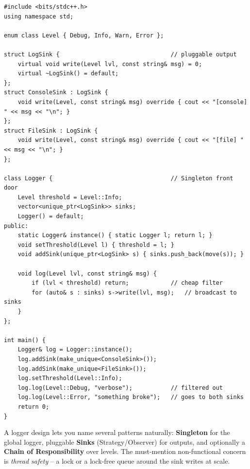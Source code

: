 \begin{lstlisting}
#include <bits/stdc++.h>
using namespace std;

enum class Level { Debug, Info, Warn, Error };

struct LogSink {                                // pluggable output
    virtual void write(Level lvl, const string& msg) = 0;
    virtual ~LogSink() = default;
};
struct ConsoleSink : LogSink {
    void write(Level, const string& msg) override { cout << "[console] " << msg << "\n"; }
};
struct FileSink : LogSink {
    void write(Level, const string& msg) override { cout << "[file] " << msg << "\n"; }
};

class Logger {                                  // Singleton front door
    Level threshold = Level::Info;
    vector<unique_ptr<LogSink>> sinks;
    Logger() = default;
public:
    static Logger& instance() { static Logger l; return l; }
    void setThreshold(Level l) { threshold = l; }
    void addSink(unique_ptr<LogSink> s) { sinks.push_back(move(s)); }

    void log(Level lvl, const string& msg) {
        if (lvl < threshold) return;            // cheap filter
        for (auto& s : sinks) s->write(lvl, msg);   // broadcast to sinks
    }
};

int main() {
    Logger& log = Logger::instance();
    log.addSink(make_unique<ConsoleSink>());
    log.addSink(make_unique<FileSink>());
    log.setThreshold(Level::Info);
    log.log(Level::Debug, "verbose");           // filtered out
    log.log(Level::Error, "something broke");   // goes to both sinks
    return 0;
}
\end{lstlisting}

\begin{takeawaybox}
A logger design lets you name several patterns naturally: \textbf{Singleton}
for the global logger, pluggable \textbf{Sinks} (Strategy/Observer) for
outputs, and optionally a \textbf{Chain of Responsibility} over levels.
The must-mention non-functional concern is \emph{thread safety} -- a lock
or a lock-free queue around the sink writes at scale.
\end{takeawaybox}
